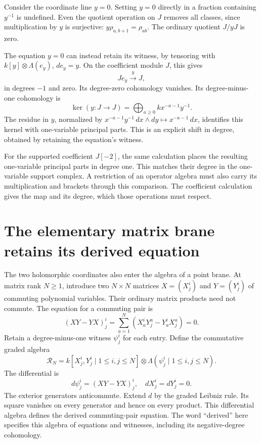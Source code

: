 Consider the coordinate line $y=0$.
Setting $y=0$ directly in a fraction containing $y^{-1}$ is undefined.
Even the quotient operation on $J$ removes all classes, since
multiplication by $y$ is surjective:
$y\rho_{a,b+1}=\rho_{ab}$.
The ordinary quotient $J/yJ$ is zero.

The equation $y=0$ can instead retain its witness, by tensoring with
$k[y]\otimes\Lambda(e_y)$, $de_y=y$.
On the coefficient module $J$, this gives
\[
 J e_y\xrightarrow{\ y\ }J,
\]
in degrees $-1$ and zero.
Its degree-zero cohomology vanishes.
Its degree-minus-one cohomology is
\[
 \ker(y:J\to J)=\bigoplus_{a\ge0} kx^{-a-1}y^{-1}.
\]
The residue in $y$, normalized by
$x^{-a-1}y^{-1}\,dx\wedge dy\mapsto x^{-a-1}\,dx$,
identifies this kernel with one-variable principal parts.
This is an explicit shift in degree, obtained by retaining the
equation's witness.

For the supported coefficient $J[-2]$, the same calculation places
the resulting one-variable principal parts in degree one.
This matches their degree in the one-variable support complex.
A restriction of an operator algebra must also carry its
multiplication and brackets through this comparison.
The coefficient calculation gives the map and its degree, which
those operations must respect.

\section{The elementary matrix brane retains its derived equation}

The two holomorphic coordinates also enter the algebra of a point
brane. At matrix rank $N\ge1$, introduce two $N\times N$ matrices
$X=(X^i_j)$ and $Y=(Y^i_j)$ of commuting polynomial variables.
Their ordinary matrix products need not commute.
The equation for a commuting pair is
\[
 (XY-YX)^i_j=\sum_{a=1}^N
 (X^i_aY^a_j-Y^i_aX^a_j)=0.
\]
Retain a degree-minus-one witness $\psi^i_j$ for each entry.
Define the commutative graded algebra
\[
 \mathcal R_N=k[X^i_j,Y^i_j\mid 1\le i,j\le N]
 \otimes\Lambda(\psi^i_j\mid1\le i,j\le N).
\]
The differential is
\[
 d\psi^i_j=(XY-YX)^i_j,
 \quad dX^i_j=dY^i_j=0.
\]
The exterior generators anticommute.
Extend $d$ by the graded Leibniz rule.
Its square vanishes on every generator and hence on every product.
This differential algebra defines the derived commuting-pair equation.
The word ``derived'' here specifies this algebra of equations and
witnesses, including its negative-degree cohomology.


